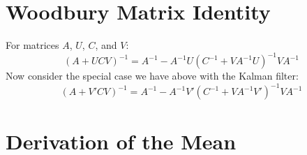 \documentclass[a4paper,12pt]{article}
\begin{document}

\newpage
\appendix

\section{Woodbury Matrix Identity}

For matrices $A$, $U$, $C$, and $V$:
\begin{equation}
    (A+UCV)^{-1} = A^{-1} - A^{-1} U(C^{-1} + VA^{-1}U)^{-1}
	VA^{-1}
\end{equation}
Now consider the special case we have above with the
Kalman filter:
\begin{equation}
    \label{special}
    (A + V'CV)^{-1} = A^{-1} - A^{-1} V'(C^{-1} + VA^{-1}V')^{-1}
	VA^{-1}
\end{equation}

\section{Derivation of the Mean}
\end{document}
